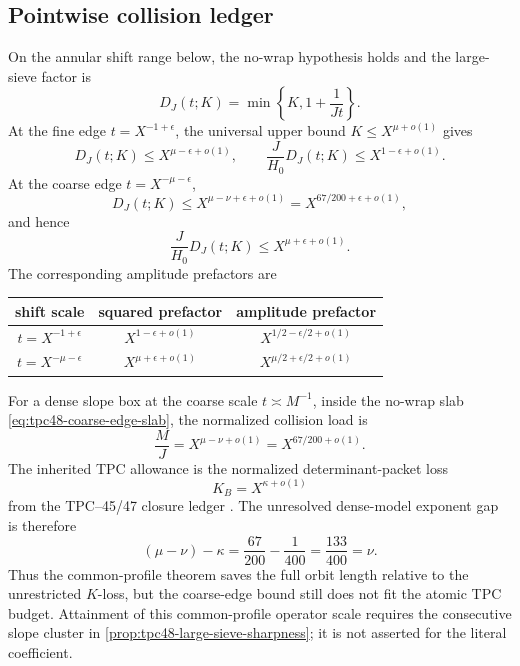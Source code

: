 \subsection{Pointwise collision ledger}

On the annular shift range below, the no-wrap hypothesis holds and
the large-sieve factor is
\begin{equation}
 D_J(t;K)=\min\left\{K,1+\frac1{Jt}\right\}.
 \label{eq:tpc48-endpoint-D}
\end{equation}
At the fine edge \(t=X^{-1+\epsilon}\), the universal upper bound
\(K\le X^{\mu+o(1)}\) gives
\begin{equation}
 D_J(t;K)\le X^{\mu-\epsilon+o(1)},
 \qquad
 \frac J{H_0}D_J(t;K)\le X^{1-\epsilon+o(1)}.
 \label{eq:tpc48-fine-edge-ledger}
\end{equation}
At the coarse edge \(t=X^{-\mu-\epsilon}\),
\begin{equation}
 D_J(t;K)\le X^{\mu-\nu+\epsilon+o(1)}
 =X^{67/200+\epsilon+o(1)},
 \label{eq:tpc48-coarse-edge-D}
\end{equation}
and hence
\begin{equation}
 \frac J{H_0}D_J(t;K)\le X^{\mu+\epsilon+o(1)}.
 \label{eq:tpc48-coarse-edge-prefactor}
\end{equation}
The corresponding amplitude prefactors are

\begin{center}
\begin{tabular}{c|c|c}
shift scale & squared prefactor & amplitude prefactor\\ \hline
\(t=X^{-1+\epsilon}\)
 & \(X^{1-\epsilon+o(1)}\)
 & \(X^{1/2-\epsilon/2+o(1)}\)\\
\(t=X^{-\mu-\epsilon}\)
 & \(X^{\mu+\epsilon+o(1)}\)
 & \(X^{\mu/2+\epsilon/2+o(1)}\)
\end{tabular}
\end{center}

For a dense slope box at the coarse scale \(t\asymp M^{-1}\), inside
the no-wrap slab \eqref{eq:tpc48-coarse-edge-slab}, the normalized
collision load is
\begin{equation}
 \frac MJ=X^{\mu-\nu+o(1)}=X^{67/200+o(1)}.
 \label{eq:tpc48-critical-collision-load}
\end{equation}
The inherited TPC allowance is the normalized determinant-packet loss
\begin{equation}
 K_B=X^{\kappa+o(1)}
 \label{eq:tpc48-inherited-allowance}
\end{equation}
from the TPC--45/47 closure ledger
\citep{WangTPC45,WangTPC47}.  The unresolved dense-model exponent gap
is therefore
\begin{equation}
 (\mu-\nu)-\kappa
 =\frac{67}{200}-\frac1{400}
 =\frac{133}{400}
 =\nu.
 \label{eq:tpc48-endpoint-allowance-gap}
\end{equation}
Thus the common-profile theorem saves the full orbit length relative
to the unrestricted \(K\)-loss, but the coarse-edge bound still does
not fit the atomic TPC budget.  Attainment of this common-profile
operator scale requires the consecutive slope cluster in
\cref{prop:tpc48-large-sieve-sharpness}; it is not asserted for the
literal coefficient.

